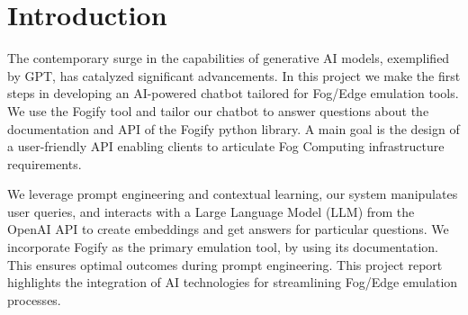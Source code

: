 \section{Introduction}
\label{sec:introduction}

The contemporary surge in the capabilities of generative AI models, exemplified
by GPT, has catalyzed significant advancements.
In this project we make the first steps in developing an AI-powered chatbot
tailored for Fog/Edge emulation tools. We use the Fogify \cite{fogify} tool and
tailor our
chatbot to answer questions about the documentation and API of the Fogify
python library.
A main goal is the design of a user-friendly API
enabling clients to articulate Fog Computing infrastructure requirements.

We leverage prompt engineering and contextual learning, our system manipulates
user queries, and interacts with a Large Language Model (LLM) from the OpenAI
API \cite{openaiapi} to create embeddings and get answers for particular
questions. We
incorporate Fogify as the primary emulation tool, by using its documentation.
This
ensures optimal outcomes during prompt engineering. This project
report highlights the integration of AI technologies for streamlining Fog/Edge
emulation processes.